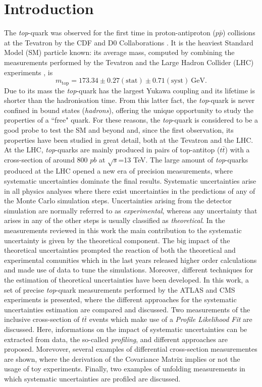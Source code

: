 \documentclass[12pt]{article}
\begin{document}
\section{Introduction}
The \emph{top}-quark was observed for the first time in proton-antiproton ($p\bar{p}$) collisions at the Tevatron by the CDF and D0 Collaborations 
\cite{Abe_1995,Abachi_1995}. It is the heaviest Standard Model (SM) particle known: its average mass, computed by combining the measurements performed by the Tevatron and the Large Hadron Collider (LHC) experiments \cite{atlas2014combination}, is 
\begin{equation}
m_{\mathrm{top}} = 173.34 \pm 0.27(\mathrm{stat}) \pm 0.71(\mathrm{syst})~\mathrm{GeV}.
\end{equation}
Due to its mass the \emph{top}-quark has the largest Yukawa coupling and its lifetime is shorter than the hadronisation time. From this latter fact, the \emph{top}-quark is never confined in bound states (\emph{hadrons}), offering the unique opportunity to study the properties of a ``free" quark.
For these reasons, the \emph{top}-quark is considered to be a good probe to test the SM and beyond and, since the first observation, its properties have been studied in great detail, both at the Tevatron and the LHC.  
At the LHC, \emph{top}-quarks are mainly produced in pairs of top-antitop ($t\bar{t}$) with a cross-section of around 800 $pb$ at $\sqrt{s}$=13 TeV.
The large amount of \emph{top}-quarks produced at the LHC opened a new era of precision measurements, where systematic uncertainties dominate the final results. Systematic uncertainties arise in all physics analyses where there exist uncertainties in the predictions of any of the Monte Carlo simulation steps. Uncertainties arising from the detector simulation are normally referred to as \emph{experimental}, whereas any uncertainty that arises in any of the other steps is usually classified as \emph{theoretical}. In the measurements reviewed in this work the main contribution to the systematic uncertainty is given by the theoretical component.
The big impact of the theoretical uncertainties prompted the reaction of both the theoretical and experimental comunities which in the last years released higher order calculations and made use of data to tune the simulations.
Moreover, different techniques for the estimation of theoretical uncertainties have been developed. In this work, a set of precise \emph{top}-quark measurements performed by the ATLAS and CMS experiments is presented, where the different approaches for the systematic uncertainties estimation are compared and discussed.
Two measurements of the inclusive cross-section of $t\bar{t}$ events which make use of a \emph{Profile Likelihood Fit} are discussed. Here, informations on the impact of systematic uncertainties can be extracted from data, the so-called \emph{profiling}, and different approaches are proposed. Morevover, several examples of differential cross-section measurementes are shown, where the derivation of the Covariance Matrix implies or not the usage of toy experiments. Finally, two examples of unfolding measurements in which systematic uncertainties are profiled are discussed. 
\end{document}
